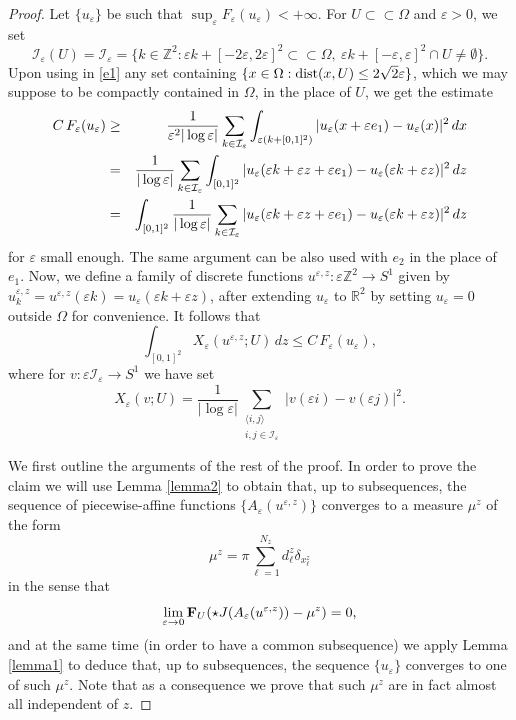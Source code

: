 \documentclass[11pt]{article}
\def\e{\varepsilon}
\def\dx{\,dx}
\begin{document}
\begin{proof}
Let $\{u_\e\}$ be such that $\sup_\e F_\e(u_\e)<+\infty$. 
For $U\subset\subset\Omega$ and $\e>0$,   
we set 
$$\mathcal I_\e(U)=\mathcal I_\e=\{k\in\mathbb Z^2: \e k+[-2\e,2\e]^2\subset\subset \Omega, \ 
\e k+[-\e,\e]^2\cap U\neq\emptyset\}.$$
Upon using in \eqref{e1} any set containing $\{x\in \Omega: \hbox{\rm dist}(x,U)\leq 2\sqrt 2\e\}$, 
which we may suppose to be compactly contained in $\Omega$, 
 in the place of $U$, 
we get the estimate 
\begin{eqnarray}\label{stimae1}
C\, F_\e(u_\e)&\ge&{1\over\e^2|\log\e|}
\sum_{k\in\mathcal I_\e} 
\int_{\e (k+ [0,1]^2)} |u_\e(x+\e e_1)-u_\e(x)|^2\dx\nonumber\\
&=&\frac{1}{|\log\e|}
\sum_{k\in\mathcal I_\e} 
\int_{[0,1]^2} |u_\e(\e k+\e z+\e e_1)-u_\e(\e k+\e z)|^2\, dz\nonumber\\
&=&
\int_{[0,1]^2}\frac{1}{|\log\e|}\sum_{k\in\mathcal I_\e} |u_\e(\e k+\e z+\e e_1)-u_\e(\e k+\e z)|^2\, dz 
\end{eqnarray}
for $\e$ small enough. 
The same argument can be also used with $e_2$ in the place of $e_1$. 
Now, we define a family of discrete functions 
$u^{\e,z}\colon\e\mathbb Z^2\to S^1$ given by  $u^{\e,z}_k=u^{\e,z}(\e k)=u_\e(\e k+\e z)$, after extending $u_\e$ to $\mathbb R^2$ by setting $u_\e=0$ outside $\Omega$ for convenience. 
It follows that  
\begin{equation}\label{stimaxe}
\int_{[0,1]^2} X_\e(u^{\e,z};U)\,dz\le C\,F_\e(u_\e),  
\end{equation} 
where for $v\colon \e\mathcal I_\e\to S^1$ we have set 
$$X_\e(v; U)=\frac{1}{|\log\e|}\sum_{\substack{\langle i,j\rangle \\ i,j\in\mathcal I_\e}}|v(\e i)-v(\e j)|^2.$$ 


We first outline the arguments of the rest of the proof. 
In order to prove the claim we 
will use Lemma \ref{lemma2} to obtain that, up to subsequences, the sequence of piecewise-affine functions $\{A_\e(u^{\e,z})\}$ converges to a measure $\mu^z$ of the form $$\mu^z=\pi\sum_{\ell=1}^{N_z}d_\ell^z\delta_{x^z_\ell}$$ in the sense that \begin{equation}\label{convuze}
\lim_{\e\to 0}{\bf F}_U(\star J(A_\e(u^{\e,z}))-\mu^z)=0,
\end{equation}
and at the same time (in order to have a common subsequence) we apply Lemma \ref{lemma1} to deduce that, up to subsequences, the sequence $\{u_\e\}$ converges to one of such $\mu^z$. Note that as a consequence we prove that such $\mu^z$ are in fact almost all independent of $z$. 


\end{proof}
\end{document}
